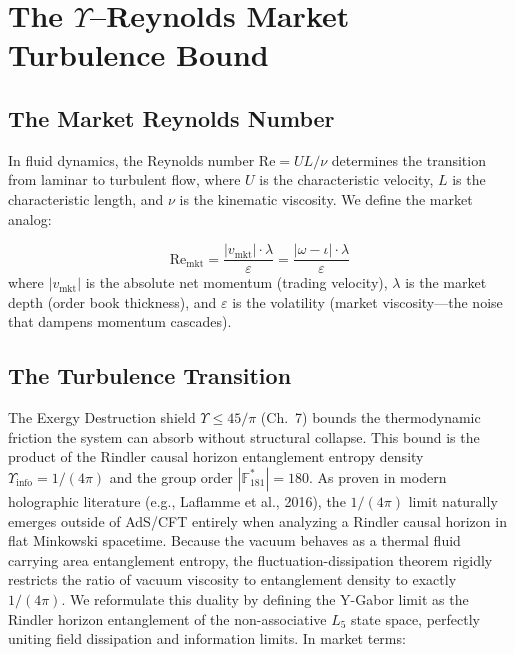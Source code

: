 \section{The $\Upsilon$--Reynolds Market Turbulence Bound}

\subsection{The Market Reynolds Number}

In fluid dynamics, the Reynolds number $\mathrm{Re} = UL/\nu$ determines the transition from laminar to turbulent flow, where $U$ is the characteristic velocity, $L$ is the characteristic length, and $\nu$ is the kinematic viscosity. We define the market analog:

\begin{definition}\label{def:reynolds_mkt}
\begin{equation}
    \mathrm{Re}_{\mathrm{mkt}} = \frac{|v_{\mathrm{mkt}}| \cdot \lambda}{\varepsilon} = \frac{|\omega - \iota| \cdot \lambda}{\varepsilon}
\end{equation}
where $|v_{\mathrm{mkt}}|$ is the absolute net momentum (trading velocity), $\lambda$ is the market depth (order book thickness), and $\varepsilon$ is the volatility (market viscosity---the noise that dampens momentum cascades).
\end{definition}

\subsection{The Turbulence Transition}

The Exergy Destruction shield $\Upsilon \leq 45/\pi$ (Ch.~7) bounds the thermodynamic friction the system can absorb without structural collapse. This bound is the product of the Rindler causal horizon entanglement entropy density $\Upsilon_{\mathrm{info}} = 1/(4\pi)$ and the group order $|\mathbb{F}_{181}^*| = 180$. As proven in modern holographic literature (e.g., Laflamme et al., 2016), the $1/(4\pi)$ limit naturally emerges outside of AdS/CFT entirely when analyzing a Rindler causal horizon in flat Minkowski spacetime. Because the vacuum behaves as a thermal fluid carrying area entanglement entropy, the fluctuation-dissipation theorem rigidly restricts the ratio of vacuum viscosity to entanglement density to exactly $1/(4\pi)$. We reformulate this duality by defining the Y-Gabor limit as the Rindler horizon entanglement of the non-associative $L_5$ state space, perfectly uniting field dissipation and information limits. In market terms:

